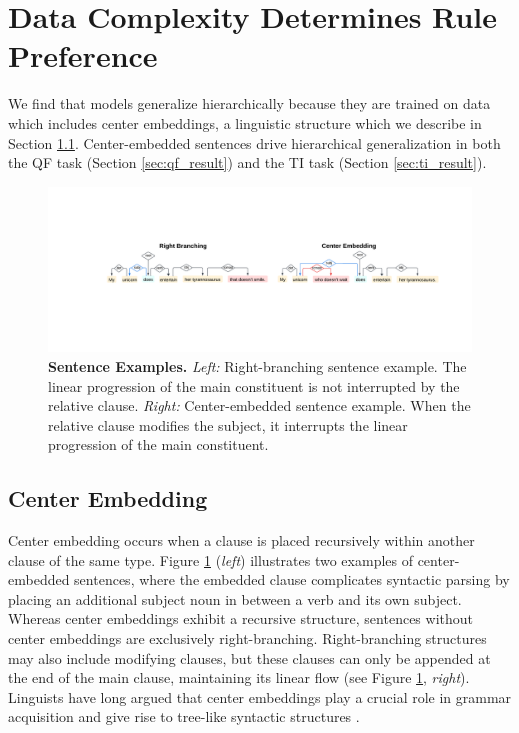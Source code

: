 \section{Data Complexity Determines Rule Preference}
\label{sec:data_complexity}

We find that models generalize hierarchically because they are trained on data which includes center embeddings, a linguistic structure which we describe in Section \ref{sec:center_embed}. Center-embedded sentences drive hierarchical generalization in both the QF task (Section \ref{sec:qf_result}) and the TI task (Section \ref{sec:ti_result}).

\begin{figure}[t!]
    \centering
    \includegraphics[width=1.0\textwidth]{figures/sentence_demo.pdf}
    \caption{\textbf{Sentence Examples.}   \textit{Left:} Right-branching sentence example. The linear progression of the main constituent is not interrupted by the relative clause. 
    \textit{Right:} Center-embedded sentence example. When the relative clause modifies the subject, it interrupts the linear progression of the main constituent. 
    }
    \label{fig:sentence_demo}
\end{figure}

\subsection{Center Embedding}
\label{sec:center_embed}
Center embedding occurs when a clause is placed recursively within another clause of the same type. Figure \ref{fig:sentence_demo} (\textit{left}) illustrates two examples of center-embedded sentences, where the embedded clause complicates syntactic parsing by placing an additional subject noun in between a verb and its own subject. Whereas center embeddings exhibit a recursive structure, sentences without center embeddings are exclusively right-branching. Right-branching structures may also include modifying clauses, but these clauses can only be appended at the end of the main clause, maintaining its linear flow (see Figure \ref{fig:sentence_demo}, \textit{right}). Linguists have long argued that center embeddings play a crucial role in grammar acquisition \citep{wexler1980formal} and give rise to tree-like syntactic structures \citep{Chomsky2015-bg}. 


